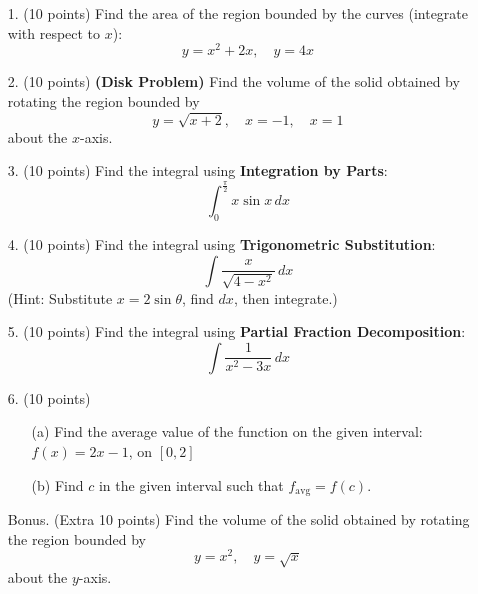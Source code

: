 \documentclass[12pt]{article}
\begin{document}
\begin{enumerate}
    \item[1.] (10 points) Find the area of the region bounded by the curves (integrate with respect to $x$):\\
    \[
    y = x^2 + 2x, \quad y = 4x
    \]

    \item[2.] (10 points) \textbf{(Disk Problem)} Find the volume of the solid obtained by rotating the region bounded by\\
    \[
    y = \sqrt{x + 2}, \quad x = -1, \quad x = 1
    \]
    about the $x$-axis.

    \item[3.] (10 points) Find the integral using \textbf{Integration by Parts}:\\
    \[
    \int_0^{\frac{\pi}{2}} x \sin x \, dx
    \]

    \item[4.] (10 points) Find the integral using \textbf{Trigonometric Substitution}:\\
    \[
    \int \frac{x}{\sqrt{4 - x^2}} \, dx
    \]
    (Hint: Substitute $x = 2\sin\theta$, find $dx$, then integrate.)

    \item[5.] (10 points) Find the integral using \textbf{Partial Fraction Decomposition}:\\
    \[
    \int \frac{1}{x^2 - 3x} \, dx
    \]

    \item[6.] (10 points)
    \begin{itemize}
        \item[(a)] Find the average value of the function on the given interval: $f(x) = 2x - 1$, on $[0, 2]$
        \item[(b)] Find $c$ in the given interval such that $f_{\text{avg}} = f(c)$.
    \end{itemize}

    \item[Bonus.] (Extra 10 points) Find the volume of the solid obtained by rotating the region bounded by\\
    \[
    y = x^2, \quad y = \sqrt{x}
    \]
    about the $y$-axis.
\end{enumerate}
\end{document}
